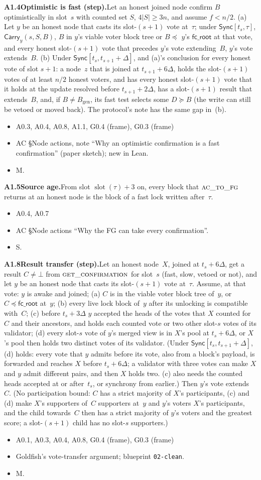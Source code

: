 \documentclass{article}
\newcommand{\genesis}{B_{\mathrm{gen}}}
\newcommand{\slot}{\operatorname{slot}}
\newcommand{\fcroot}{\mathsf{fc\_root}}
\newcommand{\fname}[1]{\text{\textsc{#1}}}
\newcommand{\dagnode}[6]{%
\par\medskip\noindent\textbf{#1\enspace #2.}\enspace #3
\begin{itemize}[leftmargin=2.2em,itemsep=0pt,topsep=2pt]
\item[\emph{Uses}] #4
\item[\emph{Evid.}] #5
\item[\emph{Task}] #6
\end{itemize}}
\begin{document}
\dagnode{A1.4}{Optimistic is fast (step)}{Let an honest joined node confirm $B$
optimistically in slot~$s$ with counted set $S$, $4|S|\geq3n$, and assume
$f<n/2$.  (a) Let $y$ be an honest node that casts its slot-$(s+1)$ vote
at~$\tau$; under $\mathsf{Sync}[t_s,\tau]$, $\mathsf{Carry}_y(s,S,B)$, $B$ in
$y$'s viable voter block tree or $B\preceq$ $y$'s $\fcroot$ at that vote, and
every honest slot-$(s+1)$ vote that precedes $y$'s vote extending~$B$, $y$'s
vote extends~$B$.  (b) Under $\mathsf{Sync}[t_s,t_{s+1}+\Delta]$, and (a)'s
conclusion for every honest vote of slot $s+1$: a node~$z$ that is joined
at $t_{s+1}+6\Delta$, holds the slot-$(s+1)$ votes of at least $n/2$ honest
voters, and has every honest slot-$(s+1)$ vote that it holds at the update
resolved before $t_{s+1}+2\Delta$, has a slot-$(s+1)$ result that extends~$B$,
and, if $B\neq\genesis$, its fast test selects some $D\succeq B$ (the write can
still be vetoed or moved back).  The protocol's note has the same gap in~(b).}
{A0.3, A0.4, A0.8, A1.1, G0.4 (frame), G0.3 (frame)}{AC \S Node actions, note ``Why an optimistic confirmation
is a fast confirmation'' (paper sketch); new in Lean.}{M.}

\dagnode{A1.5}{Source age}{From slot $\slot(\tau)+3$ on, every block that
$\fname{ac\_to\_fg}$ returns at an honest node is the block of a fast lock
written after~$\tau$.}
{A0.4, A0.7}{AC \S Node actions ``Why the FG can take every confirmation''.}{S.}

\dagnode{A1.8}{Result transfer (step)}{Let an honest node~$X$, joined at
$t_s+6\Delta$, get a result $C\neq\bot$ from $\fname{get\_confirmation}$ for
slot~$s$ (fast, slow, vetoed or not), and let $y$ be an honest node that
casts its slot-$(s+1)$ vote at~$\tau$.  Assume, at that vote: $y$ is awake and
joined; (a) $C$ is in the viable voter
block tree of~$y$, or $C\preceq\fcroot$ at~$y$; (b) every live lock block
of~$y$ after its unlocking is compatible with~$C$; (c) before $t_s+3\Delta$
$y$ accepted the heads of the votes that $X$ counted for~$C$ and their
ancestors, and holds each counted vote or two other slot-$s$ votes of its
validator; (d) every slot-$s$ vote of $y$'s merged view is in $X$'s pool at
$t_s+6\Delta$, or $X$'s pool then holds two distinct votes of its validator.
(Under $\mathsf{Sync}[t_s,t_{s+1}+\Delta]$, (d) holds: every vote that $y$
admits before its vote, also from a block's payload, is forwarded and reaches
$X$ before $t_s+6\Delta$; a validator with three votes can make $X$ and $y$
admit different pairs, and then $X$ holds two.  (c) also needs the counted heads
accepted at or after~$t_s$, or synchrony from earlier.)  Then $y$'s vote extends~$C$.  (No
participation bound: $C$ has a strict majority of $X$'s participants, (c) and
(d) make $X$'s supporters of~$C$ supporters at~$y$ and $y$'s voters $X$'s
participants, and the child towards~$C$ then has a strict majority of $y$'s
voters and the greatest score; a slot-$(s+1)$ child has no slot-$s$
supporters.)}
{A0.1, A0.3, A0.4, A0.8, G0.4 (frame), G0.3 (frame)}{Goldfish's vote-transfer argument; blueprint
\texttt{02-clean}.}{M.}
\end{document}
